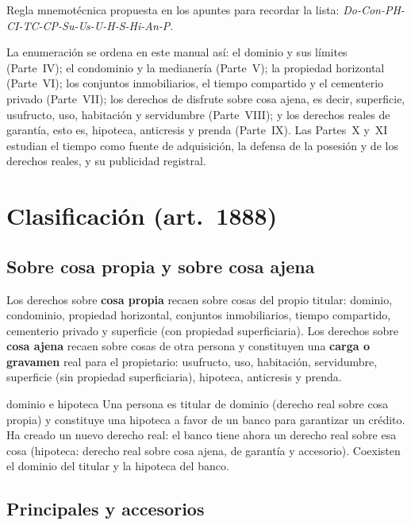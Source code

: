 \documentclass[12pt,oneside]{book}
\begin{document}
\begin{nota}
Regla mnemotécnica propuesta en los apuntes para recordar la lista: \textit{Do-Con-PH-CI-TC-CP-Su-Us-U-H-S-Hi-An-P}.
\end{nota}

La enumeración se ordena en este manual así: el dominio y sus límites (Parte~IV); el condominio y la medianería (Parte~V); la propiedad horizontal (Parte~VI); los conjuntos inmobiliarios, el tiempo compartido y el cementerio privado (Parte~VII); los derechos de disfrute sobre cosa ajena, es decir, superficie, usufructo, uso, habitación y servidumbre (Parte~VIII); y los derechos reales de garantía, esto es, hipoteca, anticresis y prenda (Parte~IX). Las Partes~X y~XI estudian el tiempo como fuente de adquisición, la defensa de la posesión y de los derechos reales, y su publicidad registral.

\section{Clasificación (art.~1888)}

\subsection{Sobre cosa propia y sobre cosa ajena}

Los derechos sobre \textbf{cosa propia} recaen sobre cosas del propio titular: dominio, condominio, propiedad horizontal, conjuntos inmobiliarios, tiempo compartido, cementerio privado y superficie (con propiedad superficiaria). Los derechos sobre \textbf{cosa ajena} recaen sobre cosas de otra persona y constituyen una \textbf{carga o gravamen} real para el propietario: usufructo, uso, habitación, servidumbre, superficie (sin propiedad superficiaria), hipoteca, anticresis y prenda.

\begin{ejemplo}{dominio e hipoteca}
Una persona es titular de dominio (derecho real sobre cosa propia) y constituye una hipoteca a favor de un banco para garantizar un crédito. Ha creado un nuevo derecho real: el banco tiene ahora un derecho real sobre esa cosa (hipoteca: derecho real sobre cosa ajena, de garantía y accesorio). Coexisten el dominio del titular y la hipoteca del banco.
\end{ejemplo}

\subsection{Principales y accesorios}
\end{document}
